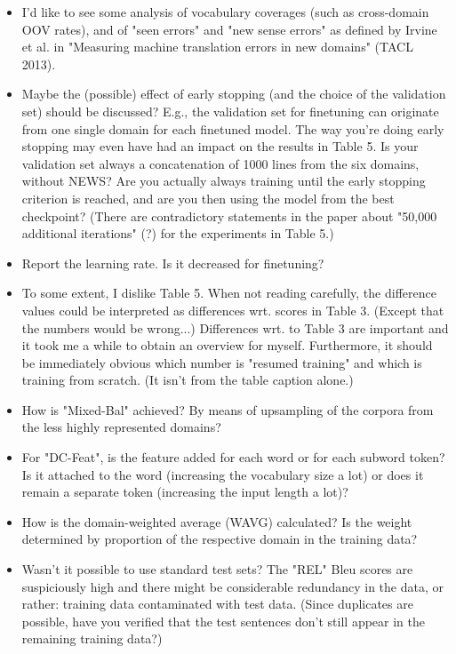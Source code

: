 \documentclass[12pt,times,a4paper,twoside]{article}
\begin{document}
\begin{itemize}
\item I'd like to see some analysis of vocabulary coverages (such as cross-domain OOV rates), and of "seen errors" and "new sense errors" as defined by Irvine et al. in "Measuring machine translation errors in new domains" (TACL 2013).
\item Maybe the (possible) effect of early stopping (and the choice of the validation set) should be discussed? E.g., the validation set for finetuning can originate from one single domain for each finetuned model. The way you're doing early stopping may even have had an impact on the results in Table 5. Is your validation set always a concatenation of 1000 lines from the six domains, without NEWS? Are you actually always training until the early stopping criterion is reached, and are you then using the model from the best checkpoint? (There are contradictory statements in the paper about "50,000 additional iterations" (?) for the experiments in Table 5.)
\item Report the learning rate. Is it decreased for finetuning?
\item To some extent, I dislike Table 5. When not reading carefully, the difference values could be interpreted as differences wrt. scores in Table 3. (Except that the numbers would be wrong...) Differences wrt. to Table 3 are important and it took me a while to obtain an overview for myself. Furthermore, it should be immediately obvious which number is "resumed training" and which is training from scratch. (It isn't from the table caption alone.)
\item How is "Mixed-Bal" achieved? By means of upsampling of the corpora from the less highly represented domains?
\item For "DC-Feat", is the feature added for each word or for each subword token? Is it attached to the word (increasing the vocabulary size a lot) or does it remain a separate token (increasing the input length a lot)?
\item How is the domain-weighted average (WAVG) calculated? Is the weight determined by proportion of the respective domain in the training data?
\item Wasn't it possible to use standard test sets? The "REL" Bleu scores are suspiciously high and there might be considerable redundancy in the data, or rather: training data contaminated with test data. (Since duplicates are possible, have you verified that the test sentences don't still appear in the remaining training data?)
\end{itemize}
\end{document}
